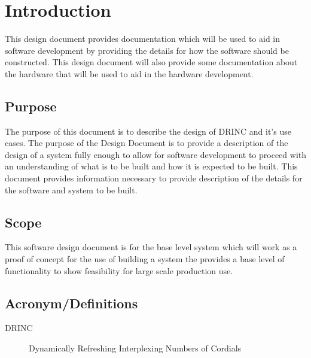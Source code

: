 \setcounter{page}{1}

\chapter{Introduction}

    This design document provides documentation which will be used to 
    aid in software development by providing the details for how the 
    software should be constructed. This design document will also 
    provide some documentation about the hardware that will be used to 
    aid in the hardware development.

\section{Purpose}

    The purpose of this document is to describe the design of DRINC and 
    it’s use cases. The purpose of the Design Document is to provide a 
    description of the design of a system fully enough to allow for 
    software development to proceed with an understanding of what is to 
    be built and how it is expected to be built. This document provides 
    information necessary to provide description of the details for the 
    software and system to be built.

\section{Scope}

    This software design document is for the base level system which 
    will work as a proof of concept for the use of building a system the 
    provides a base level of functionality to show feasibility for large 
    scale production use.

\section{Acronym/Definitions}

    \begin{description}
        \item[DRINC] Dynamically Refreshing Interplexing Numbers of Cordials
    \end{description}
